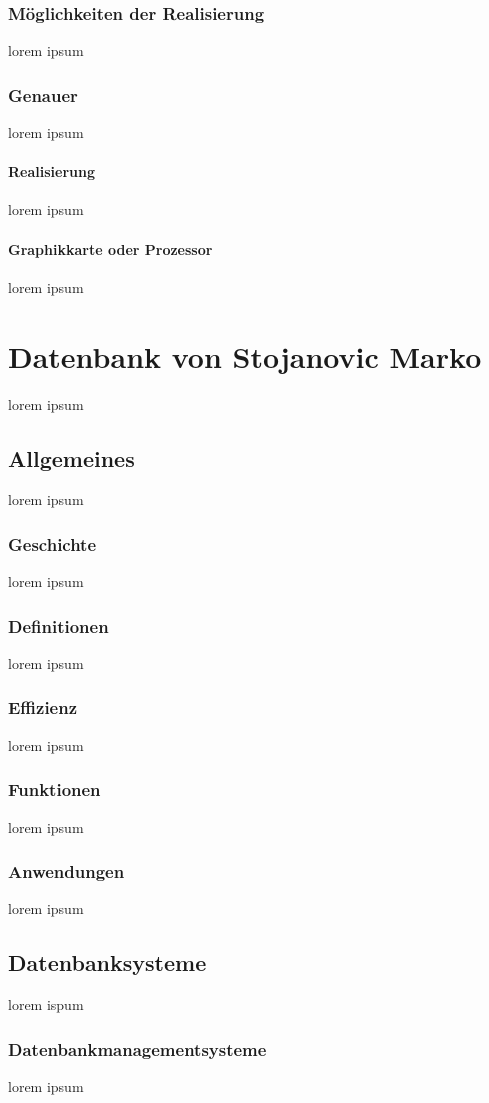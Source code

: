 \documentclass[10pt,a4paper]{report}
\begin{document}
\subsubsection{Möglichkeiten der Realisierung}
lorem ipsum
\subsubsection{Genauer}
lorem ipsum
\paragraph{Realisierung}
lorem ipsum
\paragraph{Graphikkarte oder Prozessor}
lorem ipsum
\section{Datenbank von Stojanovic Marko}
lorem ipsum
\subsection{Allgemeines}
lorem ipsum
\subsubsection{Geschichte}
lorem ipsum
\subsubsection{Definitionen}
lorem ipsum
\subsubsection{Effizienz}
lorem ipsum
\subsubsection{Funktionen}
lorem ipsum
\subsubsection{Anwendungen}
lorem ipsum
\subsection{Datenbanksysteme}
lorem ispum
\subsubsection{Datenbankmanagementsysteme}
lorem ipsum
\end{document}

